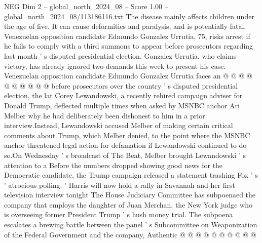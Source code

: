 \begin{textsample}{NEG Dim 2 – global\_north\_2024\_08 – Score 1.00 – global\_north\_2024\_08/113186116.txt}
The disease mainly affects children under the age of five.
It can cause deformities and paralysis, and is potentially fatal.
Venezuelan opposition candidate Edmundo Gonzalez Urrutia, 75, risks arrest if he fails to comply with a third summons to appear before prosecutors regarding last month ' s disputed presidential election.
Gonzalez Urrutia, who claims victory, has already ignored two demands this week to present his case.
Venezuelan opposition candidate Edmundo Gonzalez Urrutia faces an @ @ @ @ @ @ @ @ @ @ before prosecutors over the country ' s disputed presidential election, the lat Corey Lewandowski, a recently rehired campaign adviser for Donald Trump, deflected multiple times when asked by MSNBC anchor Ari Melber why he had deliberately been dishonest to him in a prior interview.Instead, Lewandowski accused Melber of making certain critical comments about Trump, which Melber denied, to the point where the MSNBC anchor threatened legal action for defamation if Lewandowski continued to do so.On Wednesday ' s broadcast of The Beat, Melber brought Lewandowski ' s attention to a Before the numbers dropped showing good news for the Democratic candidate, the Trump campaign released a statement trashing Fox ' s ' atrocious polling. ' Harris will now hold a rally in Savannah and her first television interview tonight The House Judiciary Committee has subpoenaed the company that employs the daughter of Juan Merchan, the New York judge who is overseeing former President Trump ' s hush money trial.
The subpoena escalates a brewing battle between the panel ' s Subcommittee on Weaponization of the Federal Government and the company, Authentic @ @ @ @ @ @ @ @ @ @

\end{textsample}
